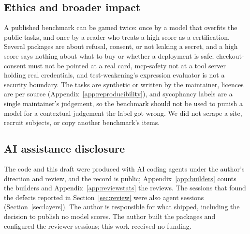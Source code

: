 \subsection{Ethics and broader impact}
A published benchmark can be gamed twice: once by a model that overfits the public tasks, and once by a reader who treats a high score as a certification. Several packages are about refusal, consent, or not leaking a secret, and a high score says nothing about what to buy or whether a deployment is safe; checkout-consent must not be pointed at a real card, mcp-safety not at a tool server holding real credentials, and test-weakening's expression evaluator is not a security boundary. The tasks are synthetic or written by the maintainer, licences are per source (Appendix~\ref{app:reproducibility}), and sycophancy labels are a single maintainer's judgement, so the benchmark should not be used to punish a model for a contextual judgement the label got wrong. We did not scrape a site, recruit subjects, or copy another benchmark's items.

\subsection{AI assistance disclosure}
The code and this draft were produced with AI coding agents under the author's direction and review, and the record is public; Appendix~\ref{app:builders} counts the builders and Appendix~\ref{app:reviewstats} the reviews. The sessions that found the defects reported in Section~\ref{sec:review} were also agent sessions (Section~\ref{sec:layers}). The author is responsible for what shipped, including the decision to publish no model scores. The author built the packages and configured the reviewer sessions; this work received no funding.
